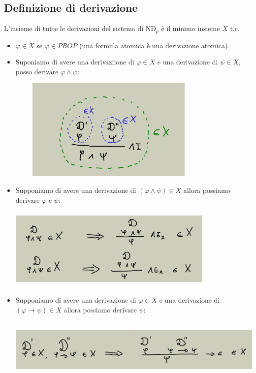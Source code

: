 \documentclass[a4paper,12pt]{report}
\begin{document}
\subsection{Definizione di derivazione}

L'insieme di tutte le derivazioni del sistema di ND$_p$ \`{e} il minimo insieme $X$ t.c.
\begin{itemize}
\item $\varphi \in X$ se $\varphi \in PROP$ (una formula atomica \`{e} una derivazione atomica).
\item Suponiamo di avere una derivaziione di $\varphi \in X$ e una derivazione di $\psi \in X$, posso derivare $\varphi \wedge \psi$:
\begin{center}
\includegraphics[width=10cm, height=5cm]{def1}
\end{center}
\item Supponiamo di avere una derivazione di $(\varphi \wedge \psi) \in X$ allora possiamo derivare $\varphi$ e $\psi$:
\begin{center}
\includegraphics[width=10cm, height=4cm]{def2}
\end{center}
\item Supponiamo di avere una derivazione di $\varphi \in X$ e una derivazione di $(\varphi \to \psi) \in X$ allora possiamo derivare $\psi$:
\begin{center}
\includegraphics[width=13cm, height=3cm]{def3}
\end{center}
\end{itemize}
\end{document}
